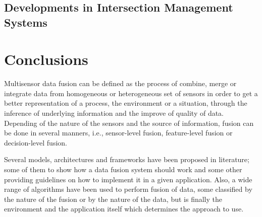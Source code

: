 

\subsection{Developments in Intersection Management Systems}

\section{Conclusions}

Multisensor data fusion can be defined as the process of combine, merge or integrate data from homogeneous or heterogeneous set of sensors in order to get a better representation of a process, the environment or a situation, through the inference of underlying information and the improve of quality of data. Depending of the nature of the sensors and the source of information, fusion can be done in several manners, i.e., sensor-level fusion, feature-level fusion or decision-level fusion.

Several models, architectures and frameworks have been proposed in literature; some of them to show how a data fusion system should work and some other providing guidelines on how to implement it in a given application. Also, a wide range of algorithms have been used to perform fusion of data, some classified by the nature of the fusion or by the nature of the data, but is finally the environment and the application itself which determines the approach to use.

%